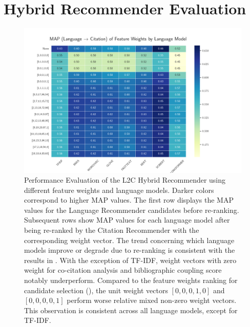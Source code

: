 \section*{Hybrid Recommender Evaluation} \label{sec:hybrid-recommender-evaluation}

\begin{figure}[htb!]
    \centering
    \includegraphics[width=\textwidth]{plots/language_models_feature_weights_heatmap_l_to_c.png}
    \caption[Performance Evaluation of the \acl{L2C} Hybrid Recommender]{Performance Evaluation of the \ac{L2C} Hybrid Recommender using different feature weights and language models. Darker colors correspond to higher \ac{MAP} values.
        The first row displays the \ac{MAP} values for the Language Recommender candidates before re-ranking. Subsequent rows show \ac{MAP} values for each language model after being re-ranked by the Citation Recommender with the corresponding weight vector.
        The trend concerning which language models improve or degrade due to re-ranking is consistent with the results in .
        With the exception of TF-IDF, weight vectors with zero weight for co-citation analysis and bibliographic coupling score notably underperform.
        Compared to the feature weights ranking for candidate selection (), the unit weight vectors $[0, 0, 0, 1, 0]$ and $[0, 0, 0, 0, 1]$ perform worse relative mixed non-zero weight vectors.
        This observation is consistent across all language models, except for TF-IDF.}
    \label{fig:language-models-feature-weights-heatmap-l2c}
\end{figure}
